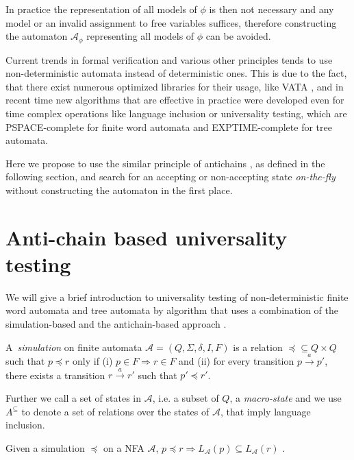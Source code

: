 In practice the representation of all models of $\phi$ is then not necessary and any model or an invalid assignment to free variables suffices, therefore constructing the automaton $\mathcal{A}_{\phi}$ representing all models of $\phi$ can be avoided. 

Current trends in formal verification and various other principles tends to use non-deterministic automata instead of deterministic ones. This is due to the fact, that there exist numerous optimized libraries for their usage, like VATA \cite{vata}, and in recent time new algorithms that are effective in practice were developed even for time complex operations like language inclusion or universality testing, which are PSPACE-complete for finite word automata and EXPTIME-complete for tree automata.  

Here we propose to use the similar principle of antichains \cite{tacas}, as defined in the following section, and search for an accepting or non-accepting state \emph{on-the-fly} without constructing the automaton in the first place.

\section{Anti-chain based universality testing}

We will give a brief introduction to universality testing of non-deterministic finite word automata and tree automata by algorithm that uses a combination of the simulation-based and the antichain-based approach \cite{tacas}.

\begin{defz}
A~\emph{simulation} on finite automata $\mathcal{A} = (Q, \Sigma, \delta, I, F)$  is a relation $\preceq \subseteq Q \times Q$ such that $p \preceq r$ only if (i) $p \in F \Rightarrow r \in F$ and (ii) for every transition $p \overset{a}{\longrightarrow} p'$, there exists a transition $r \overset{a}{\longrightarrow} r'$ such that $p' \preceq r'$.
\end{defz}

Further we call a set of states in $\mathcal{A}$, i.e. a subset of $Q$, a \emph{macro-state} and we use $A^{\subseteq}$ to denote a set of relations over the states of $\mathcal{A}$, that imply language inclusion. 

\begin{lemma}
Given a simulation $\preceq$ on a NFA $\mathcal{A}$, $p \preceq r \Rightarrow L_\mathcal{A}(p) \subseteq L_\mathcal{A}(r)$ \cite{tacas}.
\end{lemma}

